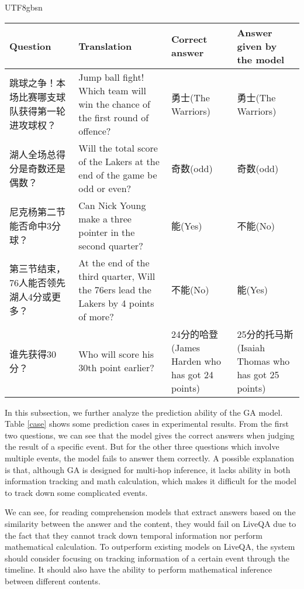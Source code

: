 \begin{CJK}{UTF8}{gbsn}
\begin{table*}[ht]
\centering
\begin{tabular}{|p{3.5cm}|p{3.5cm}|p{2.5cm}|p{2.5cm}|}
\hline
Question&Translation&Correct answer&Answer given by the model\\
\hline
跳球之争！本场比赛哪支球队获得第一轮进攻球权？&Jump ball fight! Which team will win the chance of the first round of offence?&勇士(The Warriors)&勇士(The Warriors)\\
\hline
湖人全场总得分是奇数还是偶数？&Will the total score of the Lakers at the end of the game be odd or even?&奇数(odd)&奇数(odd)\\
\hline
尼克杨第二节能否命中3分球？&Can Nick Young make a three pointer in the second quarter?&能(Yes)&不能(No)\\
\hline
第三节结束，76人能否领先湖人4分或更多？&At the end of the third quarter, Will the 76ers lead the Lakers by 4 points of more?&不能(No)&能(Yes)\\
\hline
谁先获得30分？&Who will score his 30th point earlier?&24分的哈登(James Harden who has got 24 points)&25分的托马斯(Isaiah Thomas who has got 25 points)\\
\hline
\end{tabular}
\caption{Cases in the experimental results}
\label{case}
\end{table*}
\end{CJK}

In this subsection, we further analyze the prediction ability of the GA model.
Table \ref{case} shows some prediction cases in experimental results. 
From the first two questions, we can see that the model gives the correct answers when judging the result of a specific event. But for the other three questions which involve multiple events, the model fails to answer them correctly. A possible explanation is that, although GA is designed for multi-hop inference, it lacks ability in both  information tracking and math calculation, which makes it difficult for the model to track down some complicated events. 

We can see, for reading comprehension models that extract answers based on the similarity between the answer and the content, they would fail on LiveQA due to the fact that they cannot track down temporal information nor perform mathematical calculation.
To outperform existing models on LiveQA, the system should consider focusing on tracking information of a certain event through the timeline. It should also have the ability to perform mathematical inference between different contents. 

